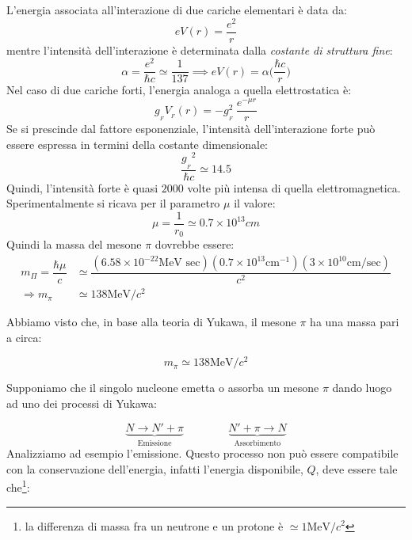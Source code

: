 L'energia associata all'interazione di due cariche elementari è data da:
\begin{equation*}
e V(r) = \dfrac{e^2}{r}
\end{equation*}
mentre l'intensità dell'interazione è determinata dalla \textit{costante di
struttura fine}:
\begin{equation*}
\alpha = \dfrac{e^2}{\hbar c} \simeq \dfrac{1}{137} \implies e V(r) = \alpha \Biggl(\dfrac{\hbar c}{r}\Biggr)
\end{equation*}
Nel caso di due cariche forti, l'energia analoga a quella elettrostatica è:
\begin{equation*}
g_{_{F}}V_{_F}(r) = - {g^2_{_{F}}} \ \dfrac{e^{-\mu r}}{r}
\end{equation*}
Se si prescinde dal fattore esponenziale, l'intensità dell'interazione forte può
essere espressa in termini della costante dimensionale:
\begin{equation*}
\dfrac{{{g}_{_F}}^2}{\hbar c} \simeq 14.5
\end{equation*}
Quindi, l'intensità forte è quasi $2000$ volte più intensa di quella
elettromagnetica. Sperimentalmente si ricava per il parametro $\mu$ il valore:
\begin{equation*}
\mu = \dfrac{1}{r_0} \simeq 0.7 	\times 10^{13} cm
\end{equation*}
Quindi la massa del mesone $\pi$ dovrebbe essere:
\begin{align*}
m_{\Pi} = \dfrac{\hbar \mu}{c} &\simeq \dfrac{(6.58 \times 10^{-22} \text{MeV
sec}) (0.7 \times 10^{13} \text{cm}^{-1}) (3 \times 10^{10} \text{cm/sec} )}{c^2} \\
\Rightarrow m_{\pi} &\simeq 138 \text{MeV}/c^2
\end{align*}

\breaknote

Abbiamo  visto che, in base alla teoria di Yukawa, il
mesone $\pi$ ha una massa pari a circa:

\begin{equation*}
  m_{\pi} \simeq 138 \text{MeV}/c^2
\end{equation*}

Supponiamo che il singolo nucleone emetta o assorba un mesone $\pi$ dando luogo
ad uno dei processi di Yukawa:

\begin{equation*}
  \underbrace{N \to N' + \pi}_\text{Emissione} \qquad \qquad \underbrace{N' +
  \pi \to N}_\text{Assorbimento}
\end{equation*}
Analizziamo ad esempio l'emissione. Questo processo non può essere compatibile
con la conservazione dell'energia, infatti l'energia disponibile, $Q$, deve
essere tale che\footnote{la differenza di massa fra un neutrone e un protone
è $\simeq 1\text{MeV}/c^2$}:

